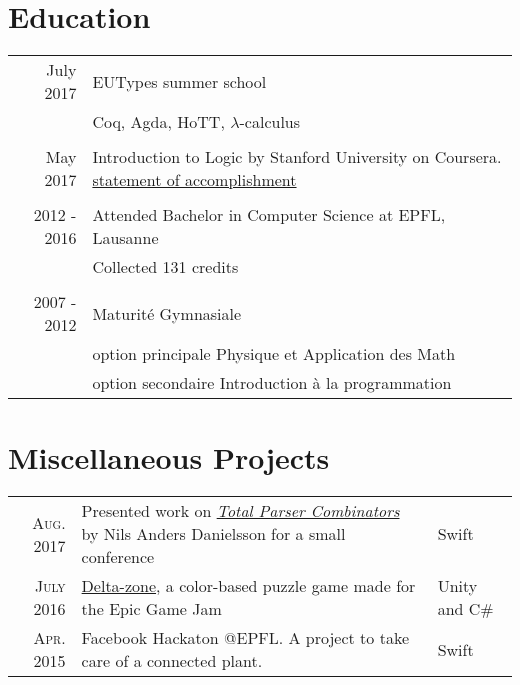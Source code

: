 \documentclass[a4paper,10pt]{article} %
\begin{document}

\section{Education}

\begin{tabular}{rl}	

July 2017 & EUTypes summer school \\&\footnotesize{Coq, Agda, HoTT, $\lambda$-calculus} \\
\multicolumn{2}{c}{}\\
May 2017 & Introduction to Logic by Stanford University on Coursera. \footnotesize{\href{https://www.coursera.org/account/accomplishments/certificate/RPGEPLA94HFF}{statement of accomplishment}}\\
\multicolumn{2}{c}{}\\
2012 - 2016 & Attended Bachelor in Computer Science at EPFL, Lausanne\\
& \footnotesize{Collected 131 credits}\\
\multicolumn{2}{c}{}\\


2007 - 2012 & Maturité Gymnasiale\\ & option principale Physique et Application des Math\\ & option secondaire Introduction à la programmation\\
\end{tabular}


\section{Miscellaneous Projects}
\renewcommand{\arraystretch}{1.5}
\begin{tabular}{rp{10cm}|l}
\textsc{Aug.} 2017 & Presented work on \href{http://www.cse.chalmers.se/~nad/publications/danielsson-parser-combinators.html}{\emph{Total Parser Combinators}} by Nils Anders Danielsson for a small conference & Swift\\
\textsc{July} 2016 & \href{http://epicgamejam.com/game/delta-zone}{Delta-zone}, a color-based puzzle game made for the Epic Game Jam & Unity and C\#\\
\textsc{Apr.} 2015 & Facebook Hackaton @EPFL. A project to take care of a connected plant. & Swift\\

\end{tabular}
\renewcommand{\arraystretch}{1.2}
\end{document}
